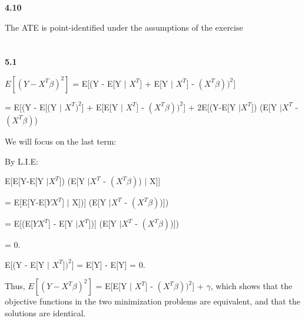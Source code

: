 \documentclass{article}
\begin{document}
\textbf{4.10}

The ATE is point-identified under the assumptions of the exercise

\section{}

\textbf{5.1}

$E[(Y- X^{T}\beta)^{2}]$ = E[(Y - E[Y $\mid$ $X^{T}$] + E[Y $\mid$ $X^{T}$] - $(X^{T}\beta))^{2}$]

= E[(Y - E[(Y $\mid$ $X^{T})^{2}$] + E[E[Y $\mid$ $X^{T}$] - $(X^{T}\beta))^{2}$] + 2E[(Y-E[Y $\mid X^{T}$]) (E[Y $\mid X^{T}$ - $(X^{T}\beta)$)

We will focus on the last term:

By L.I.E: 

E[E[Y-E[Y $\mid X^{T}$]) (E[Y $\mid X^{T}$ - $(X^{T}\beta)$) $\mid$ X]]

= E[E[Y-E[$YX^{T}$] $\mid$ X])] (E[Y $\mid X^{T}$ - $(X^{T}\beta)$)])

= E[(E[$YX^{T}$] - E[Y $\mid X^{T}$])] (E[Y $\mid X^{T}$ - $(X^{T}\beta)$)])

= 0.

E[(Y - E[Y $\mid$ $X^{T}])^{2}$] = E[Y] - E[Y] = 0.

Thus, $E[(Y- X^{T}\beta)^{2}]$ = E[E[Y $\mid$ $X^{T}$] - $(X^{T}\beta))^{2}$] + $\gamma$, which shows that the objective functions in the two minimization problems are equivalent, and that the solutions are identical.
\end{document}
